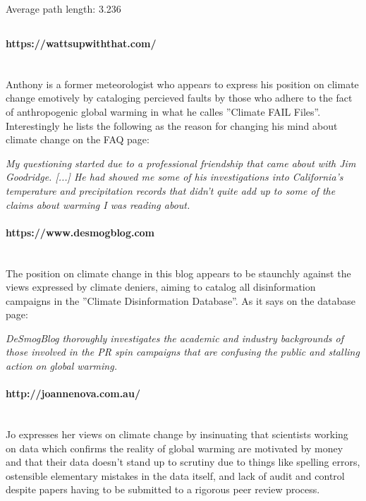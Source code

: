 \documentclass[11pt]{article}
\begin{document}
Average path length: \hfill 3.236

\subsection{}
\paragraph{https://wattsupwiththat.com/} \hspace{0pt} \\
Anthony is a former meteorologist who appears to express his position on climate
change emotively by cataloging percieved faults by those who adhere to the fact of
anthropogenic global warming in what he calles ''Climate FAIL Files''. Interestingly
he lists the following as the reason for changing his mind about climate change on
the FAQ page:

\begin{displayquote}
\textit{My questioning started due to a professional friendship that came
about with Jim Goodridge. [...] He had showed me some of his investigations into
California’s temperature and precipitation records that didn’t quite add up to some
of the claims about warming I was reading about.}
\end{displayquote}

\paragraph{https://www.desmogblog.com} \hspace{0pt} \\
The position on climate change in this blog appears to be staunchly against
the views expressed by climate deniers, aiming to catalog all disinformation
campaigns in the ''Climate Disinformation Database''. As it says on the
database page:

\begin{displayquote}
\textit{DeSmogBlog thoroughly investigates the academic and industry backgrounds of those
involved in the PR spin campaigns that are confusing the public and stalling action
on global warming.}
\end{displayquote}

\paragraph{http://joannenova.com.au/} \hspace{0pt} \\
Jo expresses her views on climate change by insinuating that scientists working on
data which confirms the reality of global warming are motivated by money and that
their data doesn't stand up to scrutiny due to things like spelling errors,
ostensible elementary mistakes in the data itself, and lack of audit and control
despite papers having to be submitted to a rigorous peer review process.
\end{document}
